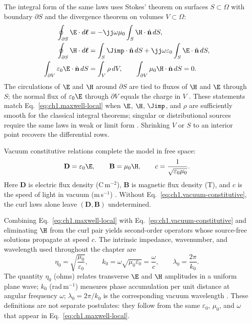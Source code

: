The integral form of the same laws uses Stokes' theorem on surfaces $S\subset\Omega$ with boundary $\partial S$ and the divergence theorem on volumes $V\subset\Omega$:
\begin{equation}
\label{eq:ch1.maxwell-integral}
\begin{aligned}
\oint_{\partial S}\E\cdot d\boldsymbol{\ell}
&=-\jj\omega\mu_0\int_S\H\cdot\hat{\mathbf{n}}\,dS,\\
\oint_{\partial S}\H\cdot d\boldsymbol{\ell}
&=\int_S\Jimp\cdot\hat{\mathbf{n}}\,dS
+\jj\omega\varepsilon_0\int_S\E\cdot\hat{\mathbf{n}}\,dS,\\
\int_{\partial V}\varepsilon_0\E\cdot\hat{\mathbf{n}}\,dS
&=\int_V\rho\,dV,\qquad
\int_{\partial V}\mu_0\H\cdot\hat{\mathbf{n}}\,dS=0.
\end{aligned}
\end{equation}
The circulations of $\E$ and $\H$ around $\partial S$ are tied to fluxes of $\H$ and $\E$ through $S$; the normal flux of $\varepsilon_0\E$ through $\partial V$ equals the charge in $V$ \cite{stratton1941}. These statements match Eq.~\eqref{eq:ch1.maxwell-local} when $\E$, $\H$, $\Jimp$, and $\rho$ are sufficiently smooth for the classical integral theorems; singular or distributional sources require the same laws in weak or limit form \cite{stratton1941}. \label{prop:ch1.local-integral-equivalence}
Shrinking $V$ or $S$ to an interior point recovers the differential rows.

Vacuum constitutive relations complete the model in free space:
\begin{equation}
\label{eq:ch1.vacuum-constitutive}
\mathbf{D}=\varepsilon_0\E,\qquad
\mathbf{B}=\mu_0\H,\qquad
c=\frac{1}{\sqrt{\varepsilon_0\mu_0}}.
\end{equation}
Here $\mathbf{D}$ is electric flux density (C\,m$^{-2}$), $\mathbf{B}$ is magnetic flux density (T), and $c$ is the speed of light in vacuum (m\,s$^{-1}$) \cite{stratton1941}. Without Eq.~\eqref{eq:ch1.vacuum-constitutive}, the curl laws alone leave $(\mathbf{D},\mathbf{B})$ undetermined.

Combining Eq.~\eqref{eq:ch1.maxwell-local} with Eq.~\eqref{eq:ch1.vacuum-constitutive} and eliminating $\H$ from the curl pair yields second-order operators whose source-free solutions propagate at speed $c$. The intrinsic impedance, wavenumber, and wavelength used throughout the chapter are
\begin{equation}
\label{eq:ch1.vacuum-impedance-wavenumber}
\eta_0=\sqrt{\frac{\mu_0}{\varepsilon_0}},\qquad
k_0=\omega\sqrt{\mu_0\varepsilon_0}=\frac{\omega}{c},\qquad
\lambda_0=\frac{2\pi}{k_0}.
\end{equation}
The quantity $\eta_0$ (ohms) relates transverse $\E$ and $\H$ amplitudes in a uniform plane wave; $k_0$ (rad\,m$^{-1}$) measures phase accumulation per unit distance at angular frequency $\omega$; $\lambda_0=2\pi/k_0$ is the corresponding vacuum wavelength \cite{stratton1941}. These definitions are not separate postulates: they follow from the same $\varepsilon_0$, $\mu_0$, and $\omega$ that appear in Eq.~\eqref{eq:ch1.maxwell-local}.

